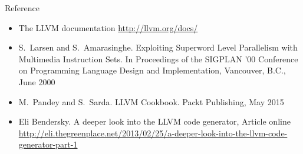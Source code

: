 \documentclass[]{beamer}
\begin{document}

\begin{frame}{Reference}
\begin{itemize}
  \item The LLVM documentation \url{http://llvm.org/docs/}
  \item S.\ Larsen and S.\ Amarasinghe. Exploiting Superword Level Parallelism with Multimedia Instruction Sets. 
        In Proceedings of the SIGPLAN '00 Conference on Programming Language Design and Implementation, 
        Vancouver, B.C., June 2000
  \item M.\ Pandey and S.\ Sarda. LLVM Cookbook. Packt Publishing, May 2015
  \item Eli Bendersky. A deeper look into the LLVM code generator, 
        Article online \url{http://eli.thegreenplace.net/2013/02/25/a-deeper-look-into-the-llvm-code-generator-part-1}
\end{itemize}
\end{frame}

\end{document}
